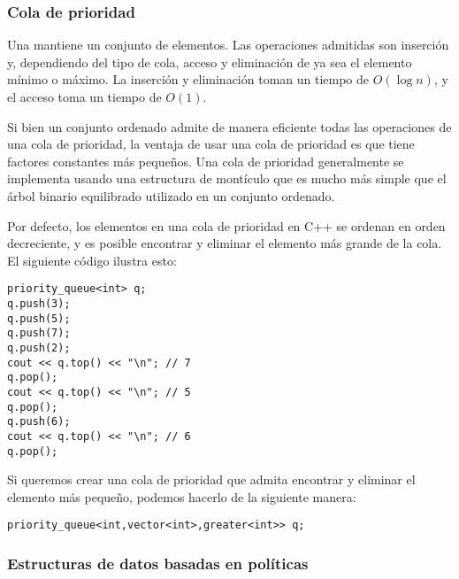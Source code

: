 \subsubsection{Cola de prioridad}


Una 
mantiene un conjunto de elementos.
Las operaciones admitidas son inserción y,
dependiendo del tipo de cola,
acceso y eliminación de
ya sea el elemento mínimo o máximo.
La inserción y eliminación toman un tiempo de $O(\log n)$,
y el acceso toma un tiempo de $O(1)$.

Si bien un conjunto ordenado admite de manera eficiente
todas las operaciones de una cola de prioridad,
la ventaja de usar una cola de prioridad es
que tiene factores constantes más pequeños.
Una cola de prioridad generalmente se implementa usando
una estructura de montículo que es mucho más simple que el
árbol binario equilibrado utilizado en un conjunto ordenado.

\begin{samepage}
    Por defecto, los elementos en una cola de prioridad en C++
    se ordenan en orden decreciente,
    y es posible encontrar y eliminar el
    elemento más grande de la cola.
    El siguiente código ilustra esto:

    \begin{lstlisting}
priority_queue<int> q;
q.push(3);
q.push(5);
q.push(7);
q.push(2);
cout << q.top() << "\n"; // 7
q.pop();
cout << q.top() << "\n"; // 5
q.pop();
q.push(6);
cout << q.top() << "\n"; // 6
q.pop();
\end{lstlisting}
\end{samepage}

Si queremos crear una cola de prioridad
que admita encontrar y eliminar
el elemento más pequeño,
podemos hacerlo de la siguiente manera:

\begin{lstlisting}
priority_queue<int,vector<int>,greater<int>> q;
\end{lstlisting}

\subsubsection{Estructuras de datos basadas en políticas}

